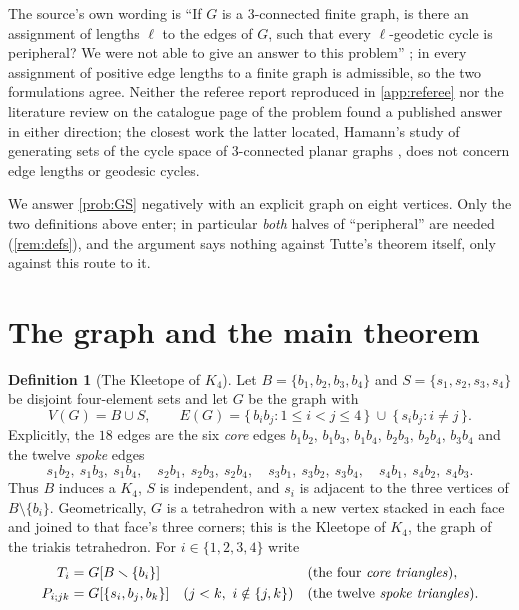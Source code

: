 \documentclass[11pt,a4paper]{article}
\theoremstyle{plain}
\theoremstyle{definition}
\newtheorem{definition}[theorem]{Definition}
\theoremstyle{remark}
\begin{document}
\noindent The source's own wording is ``If $G$ is a $3$-connected finite graph, is there an assignment of lengths $\ell$ to the edges of $G$, such that every $\ell$-geodetic cycle is peripheral? We were not able to give an answer to this problem'' \cite[\S5]{GS09}; in \cite{GS09} every assignment of positive edge lengths to a finite graph is admissible, so the two formulations agree. Neither the referee report reproduced in \cref{app:referee} nor the literature review on the catalogue page of the problem found a published answer in either direction; the closest work the latter located, Hamann's study of generating sets of the cycle space of $3$-connected planar graphs \cite{Hamann14}, does not concern edge lengths or geodesic cycles.

We answer \cref{prob:GS} negatively with an explicit graph on eight vertices. Only the two definitions above enter; in particular \emph{both} halves of ``peripheral'' are needed (\cref{rem:defs}), and the argument says nothing against Tutte's theorem itself, only against this route to it.

\section{The graph and the main theorem}

\begin{definition}[The Kleetope of $K_4$]\label{def:G}
Let $B=\{b_1,b_2,b_3,b_4\}$ and $S=\{s_1,s_2,s_3,s_4\}$ be disjoint four-element sets and let $G$ be the graph with
\[
V(G)=B\cup S,\qquad
E(G)=\{\,b_ib_j : 1\le i<j\le 4\,\}\ \cup\ \{\,s_ib_j : i\ne j\,\}.
\]
Explicitly, the $18$ edges are the six \emph{core} edges $b_1b_2,\,b_1b_3,\,b_1b_4,\,b_2b_3,\,b_2b_4,\,b_3b_4$ and the twelve \emph{spoke} edges
\[
s_1b_2,\ s_1b_3,\ s_1b_4,\quad s_2b_1,\ s_2b_3,\ s_2b_4,\quad s_3b_1,\ s_3b_2,\ s_3b_4,\quad s_4b_1,\ s_4b_2,\ s_4b_3 .
\]
Thus $B$ induces a $K_4$, $S$ is independent, and $s_i$ is adjacent to the three vertices of $B\setminus\{b_i\}$. Geometrically, $G$ is a tetrahedron with a new vertex stacked in each face and joined to that face's three corners; this is the Kleetope of $K_4$, the graph of the triakis tetrahedron. For $i\in\{1,2,3,4\}$ write
\begin{align*}
T_i&=G[B\setminus\{b_i\}]&&\text{(the four \emph{core triangles})},\\
P_{i;jk}&=G[\{s_i,b_j,b_k\}]\quad(j<k,\ i\notin\{j,k\})&&\text{(the twelve \emph{spoke triangles})}.
\end{align*}
\end{definition}
\end{document}
